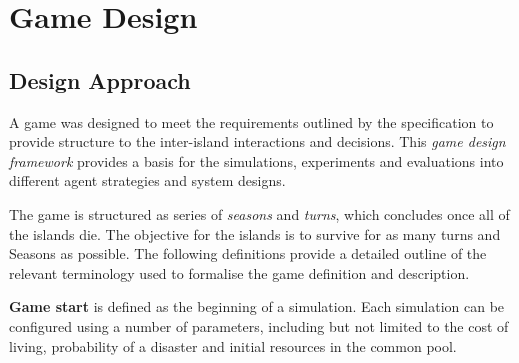 \chapter{Game Design}

\section{Design Approach}

A game was designed to meet the requirements outlined by the specification to provide structure to the inter-island interactions and decisions. This \emph{game design framework} provides a basis for the simulations, experiments and evaluations into different agent strategies and system designs.

The game is structured as series of \emph{seasons} and \emph{turns}, which concludes once all of the islands die. The objective for the islands is to survive for as many turns and Seasons as possible. The following definitions provide a detailed outline of the relevant terminology used to formalise the game definition and description.

\begin{definition} \label{def:gamestart}
    \textbf{Game start} is defined as the beginning of a simulation. Each simulation can be configured using a number of parameters, including but not limited to the cost of living, probability of a disaster and initial resources in the common pool.
\end{definition}

